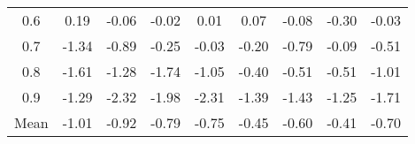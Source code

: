 \documentclass[11pt,a4paper]{report}
\begin{document}
\begin{centering}
\begin{longtable}{ | c || c | c | c | c | c | c | c || c |}
0.6 &  \cellcolor[HTML]{F7F7FF} 0.19 &  \cellcolor[HTML]{FFFFFF} -0.06 &  \cellcolor[HTML]{FFFFFF} -0.02 &  \cellcolor[HTML]{FFFFFF} 0.01 &  \cellcolor[HTML]{FFFFFF} 0.07 &  \cellcolor[HTML]{FFFFFF} -0.08 &  \cellcolor[HTML]{FFF7F7} -0.30 &  \cellcolor[HTML]{FFFFFF} -0.03 \\
0.7 &  \cellcolor[HTML]{FFDFDF} -1.34 &  \cellcolor[HTML]{FFE7E7} -0.89 &  \cellcolor[HTML]{FFF7F7} -0.25 &  \cellcolor[HTML]{FFFFFF} -0.03 &  \cellcolor[HTML]{FFF7F7} -0.20 &  \cellcolor[HTML]{FFEFEF} -0.79 &  \cellcolor[HTML]{FFFFFF} -0.09 &  \cellcolor[HTML]{FFEFEF} -0.51 \\
0.8 &  \cellcolor[HTML]{FFD7D7} -1.61 &  \cellcolor[HTML]{FFDFDF} -1.28 &  \cellcolor[HTML]{FFD7D7} -1.74 &  \cellcolor[HTML]{FFE7E7} -1.05 &  \cellcolor[HTML]{FFF7F7} -0.40 &  \cellcolor[HTML]{FFEFEF} -0.51 &  \cellcolor[HTML]{FFEFEF} -0.51 &  \cellcolor[HTML]{FFE7E7} -1.01 \\
0.9 &  \cellcolor[HTML]{FFDFDF} -1.29 &  \cellcolor[HTML]{FFC7C7} -2.32 &  \cellcolor[HTML]{FFCFCF} -1.98 &  \cellcolor[HTML]{FFC7C7} -2.31 &  \cellcolor[HTML]{FFDFDF} -1.39 &  \cellcolor[HTML]{FFD7D7} -1.43 &  \cellcolor[HTML]{FFDFDF} -1.25 &  \cellcolor[HTML]{FFD7D7} -1.71 \\
\hline
\hline
Mean  &  \cellcolor[HTML]{FFE7E7} -1.01 &  \cellcolor[HTML]{FFE7E7} -0.92 &  \cellcolor[HTML]{FFEFEF} -0.79 &  \cellcolor[HTML]{FFEFEF} -0.75 &  \cellcolor[HTML]{FFF7F7} -0.45 &  \cellcolor[HTML]{FFEFEF} -0.60 &  \cellcolor[HTML]{FFF7F7} -0.41 &  \cellcolor[HTML]{FFEFEF} -0.70 \\
\hline
\end{longtable}


\end{centering}
\end{document}
